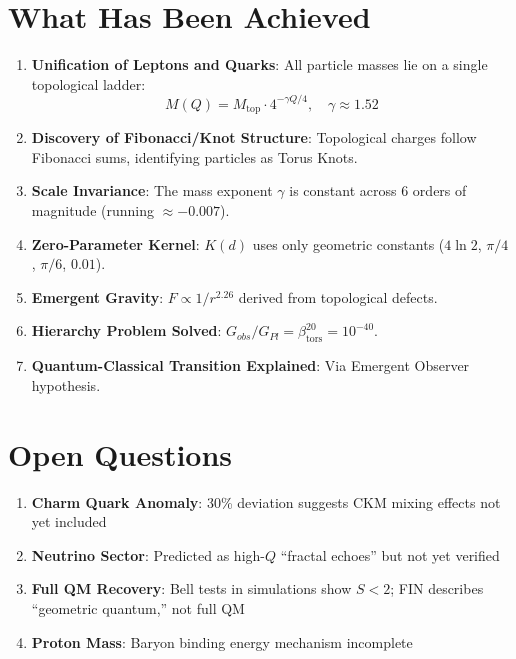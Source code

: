 \documentclass[11pt,a4paper]{book}
\theoremstyle{remark}
\newcommand{\Kd}{K(d)}
\newcommand{\betators}{\beta_{\text{tors}}}
\newcommand{\Mtop}{M_{\text{top}}}
\begin{document}
\section{What Has Been Achieved}

\begin{enumerate}
    \item \textbf{Unification of Leptons and Quarks}: All particle masses lie on a single topological ladder:
    \begin{equation}
    M(Q) = \Mtop \cdot 4^{-\gamma Q/4}, \quad \gamma \approx 1.52
    \end{equation}
    
    \item \textbf{Discovery of Fibonacci/Knot Structure}: Topological charges follow Fibonacci sums, identifying particles as Torus Knots.
    
    \item \textbf{Scale Invariance}: The mass exponent $\gamma$ is constant across 6 orders of magnitude (running $\approx -0.007$).
    
    \item \textbf{Zero-Parameter Kernel}: $\Kd$ uses only geometric constants ($4\ln 2$, $\pi/4$, $\pi/6$, $0.01$).
    
    \item \textbf{Emergent Gravity}: $F \propto 1/r^{2.26}$ derived from topological defects.
    
    \item \textbf{Hierarchy Problem Solved}: $G_{obs}/G_{Pl} = \betators^{20} = 10^{-40}$.
    
    \item \textbf{Quantum-Classical Transition Explained}: Via Emergent Observer hypothesis.
\end{enumerate}

\section{Open Questions}

\begin{enumerate}
    \item \textbf{Charm Quark Anomaly}: 30\% deviation suggests CKM mixing effects not yet included
    
    \item \textbf{Neutrino Sector}: Predicted as high-$Q$ ``fractal echoes'' but not yet verified
    
    \item \textbf{Full QM Recovery}: Bell tests in simulations show $S < 2$; FIN describes ``geometric quantum,'' not full QM
    
    \item \textbf{Proton Mass}: Baryon binding energy mechanism incomplete
\end{enumerate}
\end{document}
